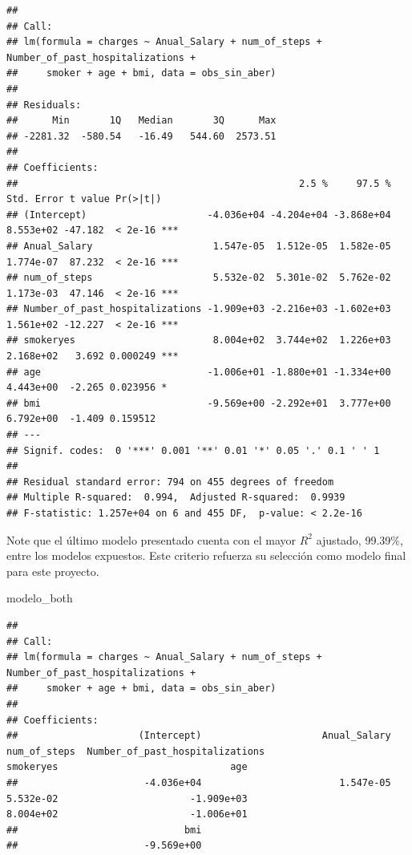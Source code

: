 \documentclass[
]{article}
\newenvironment{Shaded}{\begin{snugshade}}{\end{snugshade}}
\newcommand{\NormalTok}[1]{#1}
\begin{document}
\begin{verbatim}
## 
## Call:
## lm(formula = charges ~ Anual_Salary + num_of_steps + Number_of_past_hospitalizations + 
##     smoker + age + bmi, data = obs_sin_aber)
## 
## Residuals:
##      Min       1Q   Median       3Q      Max 
## -2281.32  -580.54   -16.49   544.60  2573.51 
## 
## Coefficients:
##                                                 2.5 %     97.5 % Std. Error t value Pr(>|t|)    
## (Intercept)                     -4.036e+04 -4.204e+04 -3.868e+04  8.553e+02 -47.182  < 2e-16 ***
## Anual_Salary                     1.547e-05  1.512e-05  1.582e-05  1.774e-07  87.232  < 2e-16 ***
## num_of_steps                     5.532e-02  5.301e-02  5.762e-02  1.173e-03  47.146  < 2e-16 ***
## Number_of_past_hospitalizations -1.909e+03 -2.216e+03 -1.602e+03  1.561e+02 -12.227  < 2e-16 ***
## smokeryes                        8.004e+02  3.744e+02  1.226e+03  2.168e+02   3.692 0.000249 ***
## age                             -1.006e+01 -1.880e+01 -1.334e+00  4.443e+00  -2.265 0.023956 *  
## bmi                             -9.569e+00 -2.292e+01  3.777e+00  6.792e+00  -1.409 0.159512    
## ---
## Signif. codes:  0 '***' 0.001 '**' 0.01 '*' 0.05 '.' 0.1 ' ' 1
## 
## Residual standard error: 794 on 455 degrees of freedom
## Multiple R-squared:  0.994,  Adjusted R-squared:  0.9939 
## F-statistic: 1.257e+04 on 6 and 455 DF,  p-value: < 2.2e-16
\end{verbatim}

Note que el último modelo presentado cuenta con el mayor \(R^2\)
ajustado, 99.39\%, entre los modelos expuestos. Este criterio refuerza
su selección como modelo final para este proyecto.

\begin{Shaded}
\begin{Highlighting}[]
\NormalTok{modelo\_both}
\end{Highlighting}
\end{Shaded}

\begin{verbatim}
## 
## Call:
## lm(formula = charges ~ Anual_Salary + num_of_steps + Number_of_past_hospitalizations + 
##     smoker + age + bmi, data = obs_sin_aber)
## 
## Coefficients:
##                     (Intercept)                     Anual_Salary                     num_of_steps  Number_of_past_hospitalizations                        smokeryes                              age  
##                      -4.036e+04                        1.547e-05                        5.532e-02                       -1.909e+03                        8.004e+02                       -1.006e+01  
##                             bmi  
##                      -9.569e+00
\end{verbatim}
\end{document}

